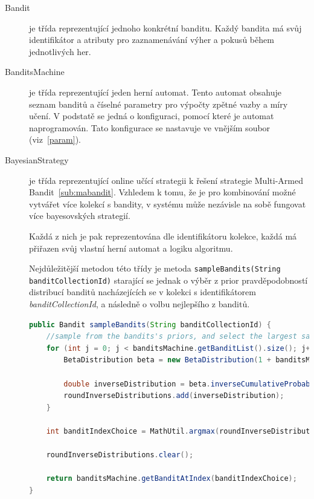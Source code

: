 \documentclass[thesis=M,czech]{FITthesis}[2014/05/07]
\begin{document}
\begin{description}
	\item[Bandit] je třída reprezentující jednoho konkrétní banditu. Každý bandita má svůj identifikátor a atributy pro zaznamenávání výher a pokusů během jednotlivých her.
	\item[BanditsMachine] je třída reprezentující jeden herní automat. Tento automat obsahuje seznam banditů a číselné parametry pro výpočty zpětné vazby a míry učení. V podstatě se jedná o konfiguraci, pomocí které je automat naprogramován. Tato konfigurace se nastavuje ve vnějším soubor (viz~\ref{param}).
	\item[BayesianStrategy]	je třída reprezentující online učící strategii k řešení strategie Multi-Armed Bandit~\ref{sub:mabandit}. Vzhledem k tomu, že je pro kombinování možné vytvářet více kolekcí s bandity, v systému může nezávisle na sobě fungovat více bayesovských strategií. 
	
	Každá z nich je pak reprezentována dle identifikátoru kolekce, každá má přiřazen svůj vlastní herní automat a logiku algoritmu.  
	
	Nejdůležitější metodou této třídy je metoda \texttt{sampleBandits(String banditCollectionId)} starající se jednak o výběr z prior pravděpodobností distribucí banditů nacházejících se v kolekci s identifikátorem \emph{banditCollectionId}, a následně o volbu nejlepšího z banditů. 
	
\begin{lstlisting}[language=java]
public Bandit sampleBandits(String banditCollectionId) {
    //sample from the bandits's priors, and select the largest sample
    for (int j = 0; j < banditsMachine.getBanditList().size(); j++) {
        BetaDistribution beta = new BetaDistribution(1 + banditsMachine.getBanditAtIndex(j).getSuccesses(), 1 + banditsMachine.getBanditAtIndex(j).getTrials() - banditsMachine.getBanditAtIndex(j).getSuccesses());

        double inverseDistribution = beta.inverseCumulativeProbability(Math.random());
        roundInverseDistributions.add(inverseDistribution);
    }

    int banditIndexChoice = MathUtil.argmax(roundInverseDistributions);

    roundInverseDistributions.clear();

    return banditsMachine.getBanditAtIndex(banditIndexChoice);
}
\end{lstlisting}	
	
\end{description}
\end{document}
